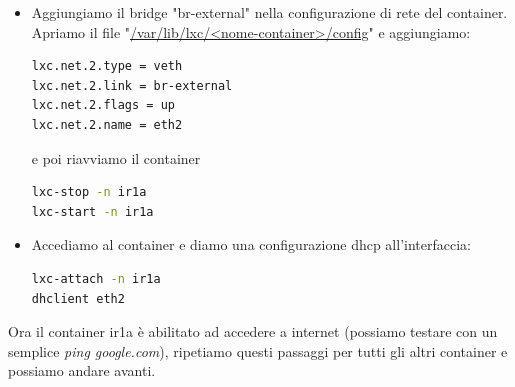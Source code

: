 \documentclass[12pt,a4paper,twoside]{book}
\begin{document}
\begin{itemize}
    \item Aggiungiamo il bridge "br-external" nella configurazione di rete del container.
    Apriamo il file "\url{/var/lib/lxc/<nome-container>/config}" e aggiungiamo:
    \begin{lstlisting}[language=bash]
lxc.net.2.type = veth
lxc.net.2.link = br-external
lxc.net.2.flags = up
lxc.net.2.name = eth2
    \end{lstlisting}
    e poi riavviamo il container 
        \begin{lstlisting}[language=bash]
lxc-stop -n ir1a
lxc-start -n ir1a
    \end{lstlisting}
    \item Accediamo al container e diamo una configurazione dhcp all'interfaccia:
    \begin{lstlisting}[language=bash]
lxc-attach -n ir1a
dhclient eth2
    \end{lstlisting}
\end{itemize}
Ora il container ir1a è abilitato ad accedere a internet (possiamo testare con un semplice \textit{ping google.com}), ripetiamo questi passaggi per tutti gli altri container e possiamo andare avanti.
\end{document}
